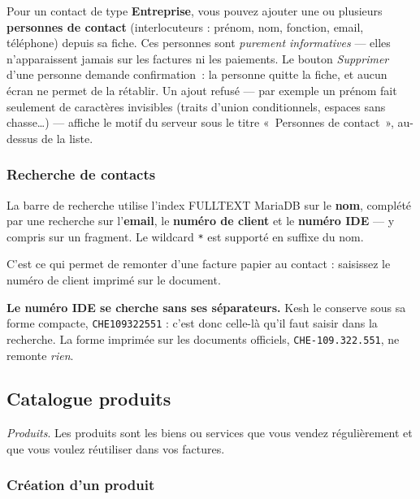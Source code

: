 \documentclass[a4paper,11pt,oneside]{article}
\begin{document}
\begin{keshnote}
Pour un contact de type \textbf{Entreprise}, vous pouvez ajouter une ou plusieurs
\textbf{personnes de contact} (interlocuteurs : prénom, nom, fonction, email,
téléphone) depuis sa fiche. Ces personnes sont \emph{purement informatives} —
elles n'apparaissent jamais sur les factures ni les paiements. Le bouton
\emph{Supprimer} d'une personne demande confirmation~: la personne quitte la fiche,
et aucun écran ne permet de la rétablir. Un ajout refusé --- par exemple un prénom
fait seulement de caractères invisibles (traits d'union conditionnels, espaces sans chasse…) ---
affiche le motif du serveur sous le titre «~Personnes de contact~», au-dessus de la liste.
\end{keshnote}

\subsubsection{Recherche de contacts}

La barre de recherche utilise l'index FULLTEXT MariaDB sur le \textbf{nom}, complété par une recherche sur l'\textbf{email}, le \textbf{numéro de client} et le \textbf{numéro IDE} --- y compris sur un fragment. Le wildcard \texttt{*} est supporté en suffixe du nom.

C'est ce qui permet de remonter d'une facture papier au contact : saisissez le numéro de client imprimé sur le document.

\begin{keshwarning}
\textbf{Le numéro IDE se cherche sans ses séparateurs.} Kesh le conserve sous sa
forme compacte, \texttt{CHE109322551} : c'est donc celle-là qu'il faut saisir
dans la recherche. La forme imprimée sur les documents officiels,
\texttt{CHE-109.322.551}, ne remonte \emph{rien}.
\end{keshwarning}

\subsection{Catalogue produits}

\emph{Produits}. Les produits sont les biens ou services que vous vendez régulièrement et que vous voulez réutiliser dans vos factures.

\subsubsection{Création d'un produit}
\end{document}
